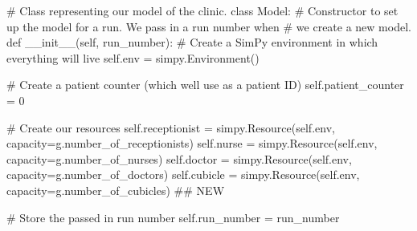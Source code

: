 \documentclass[
  letterpaper,
  DIV=11,
  numbers=noendperiod]{scrreprt}
\newenvironment{Shaded}{\begin{snugshade}}{\end{snugshade}}
\newcommand{\CommentTok}[1]{\textcolor[rgb]{0.37,0.37,0.37}{#1}}
\newcommand{\DecValTok}[1]{\textcolor[rgb]{0.68,0.00,0.00}{#1}}
\newcommand{\FunctionTok}[1]{\textcolor[rgb]{0.28,0.35,0.67}{#1}}
\newcommand{\KeywordTok}[1]{\textcolor[rgb]{0.00,0.23,0.31}{#1}}
\newcommand{\NormalTok}[1]{\textcolor[rgb]{0.00,0.23,0.31}{#1}}
\newcommand{\OperatorTok}[1]{\textcolor[rgb]{0.37,0.37,0.37}{#1}}
\newcommand{\VariableTok}[1]{\textcolor[rgb]{0.07,0.07,0.07}{#1}}
\begin{document}
\begin{tcolorbox}
\begin{Shaded}
\begin{Highlighting}[]
\CommentTok{\# Class representing our model of the clinic.}
\KeywordTok{class}\NormalTok{ Model:}
    \CommentTok{\# Constructor to set up the model for a run.  We pass in a run number when}
    \CommentTok{\# we create a new model.}
    \KeywordTok{def} \FunctionTok{\_\_init\_\_}\NormalTok{(}\VariableTok{self}\NormalTok{, run\_number):}
        \CommentTok{\# Create a SimPy environment in which everything will live}
        \VariableTok{self}\NormalTok{.env }\OperatorTok{=}\NormalTok{ simpy.Environment()}

        \CommentTok{\# Create a patient counter (which we\textquotesingle{}ll use as a patient ID)}
        \VariableTok{self}\NormalTok{.patient\_counter }\OperatorTok{=} \DecValTok{0}

        \CommentTok{\# Create our resources}
        \VariableTok{self}\NormalTok{.receptionist }\OperatorTok{=}\NormalTok{ simpy.Resource(}\VariableTok{self}\NormalTok{.env, capacity}\OperatorTok{=}\NormalTok{g.number\_of\_receptionists)}
        \VariableTok{self}\NormalTok{.nurse }\OperatorTok{=}\NormalTok{ simpy.Resource(}\VariableTok{self}\NormalTok{.env, capacity}\OperatorTok{=}\NormalTok{g.number\_of\_nurses)}
        \VariableTok{self}\NormalTok{.doctor }\OperatorTok{=}\NormalTok{ simpy.Resource(}\VariableTok{self}\NormalTok{.env, capacity}\OperatorTok{=}\NormalTok{g.number\_of\_doctors)}
        \VariableTok{self}\NormalTok{.cubicle }\OperatorTok{=}\NormalTok{ simpy.Resource(}\VariableTok{self}\NormalTok{.env, capacity}\OperatorTok{=}\NormalTok{g.number\_of\_cubicles) }\CommentTok{\#\# NEW}

        \CommentTok{\# Store the passed in run number}
        \VariableTok{self}\NormalTok{.run\_number }\OperatorTok{=}\NormalTok{ run\_number}


\end{Highlighting}
\end{Shaded}
\end{tcolorbox}
\end{document}
